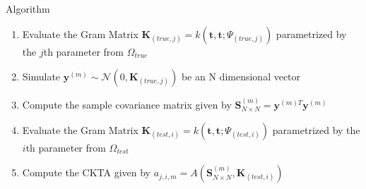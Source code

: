 \documentclass[11pt, a4paper]{article} %
\begin{document}
\hfill

\begin{algorithm}[H]


\label{algo_exp1}
\caption{Algorithm}

\BlankLine
\addtolength\linewidth{-12ex}


\begin{enumerate}

\item Evaluate the Gram Matrix $\mathbf{K}_{(true,j)} = k(\mathbf{t},\mathbf{t}; \Psi_{(true,j)})$ parametrized by the $j$th parameter from $\Omega_{true}$ \\

\item Simulate $\mathbf{y}^{(m)} \sim \mathcal{N}(0, \mathbf{K}_{(true,j)})$ be an N dimensional vector\\
\item Compute the sample covariance matrix given by $\mathbf{S}_{N \times N}^{(m)} = \mathbf{y}^{(m) T} \mathbf{y}^{(m)}$ \\

\item Evaluate the Gram Matrix $\mathbf{K}_{(test,i)} = k( \mathbf{t}, \mathbf{t}; \Psi_{(test,i)})$ parametrized by the $i$th parameter from $\Omega_{test}$ \\

\item Compute the CKTA given by $a_{j,i,m} = A(\mathbf{S}_{N \times N}^{(m)},\mathbf{K}_{(test,i)} )$

\end{enumerate}

\end{algorithm}


\hfill
\newpage
\end{document}

